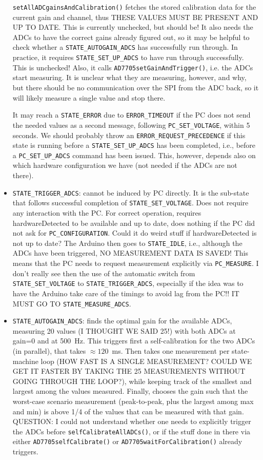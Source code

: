 \documentclass[11pt,a4paper,english]{article}
\begin{document}
\begin{itemize}
	\texttt{setAllADCgainsAndCalibration()} fetches the stored calibration data for the current gain and channel, thus THESE VALUES MUST BE PRESENT AND UP TO DATE. This is currently unchecked, but should be! It also needs the ADCs to have the correct gains already figured out, so it may be helpful to check whether a \texttt{STATE\_AUTOGAIN\_ADCS} has successfully run through. In practice, it requires \texttt{STATE\_SET\_UP\_ADCS} to have run through successfully. This is unchecked! Also, it calls \texttt{AD7705setGainAndTrigger()}, i.e. the ADCs start measuring. It is unclear what they are measuring, however, and why, but there should be no communication over the SPI from the ADC back, so it will likely measure a single value and stop there.

	It may reach a \texttt{STATE\_ERROR} due to \texttt{ERROR\_TIMEOUT} if the PC does not send the needed values as a second message, following \texttt{PC\_SET\_VOLTAGE}, within 5 seconds. We should probably throw an \texttt{ERROR\_REQUEST\_PRECEDENCE} if this state is running before a \texttt{STATE\_SET\_UP\_ADCS} has been completed, i.e., before a \texttt{PC\_SET\_UP\_ADCS} command has been issued. This, however, depends also on which hardware configuration we have (not needed if the ADCs are not there).

\item \texttt{STATE\_TRIGGER\_ADCS}: cannot be induced by PC directly. It is the sub-state that follows successful completion of \texttt{STATE\_SET\_VOLTAGE}. Does not require any interaction with the PC. For correct operation, requires hardwareDetected to be available and up to date, does nothing if the PC did not ask for \texttt{PC\_CONFIGURATION}. Could it do weird stuff if hardwareDetected is not up to date? The Arduino then goes to \texttt{STATE\_IDLE}, i.e., although the ADCs have been triggered, NO MEASUREMENT DATA IS SAVED! This means that the PC needs to request measurement explicitly via \texttt{PC\_MEASURE}. I don't really see then the use of the automatic switch from \texttt{STATE\_SET\_VOLTAGE} to \texttt{STATE\_TRIGGER\_ADCS}, especially if the idea was to have the Arduino take care of the timings to avoid lag from the PC!! IT MUST GO TO \texttt{STATE\_MEASURE\_ADCS}.

\item \texttt{STATE\_AUTOGAIN\_ADCS}: finds the optimal gain for the available ADCs, measuring 20 values (I THOUGHT WE SAID 25!) with both ADCs at gain=0 and at 500~Hz. This triggers first a self-calibration for the two ADCs (in parallel), that takes $\approx120$~ms. Then takes one measurement per state-machine loop (HOW FAST IS A SINGLE MEASUREMENT? COULD WE GET IT FASTER BY TAKING THE 25 MEASUREMENTS WITHOUT GOING THROUGH THE LOOP?), while keeping track of the smallest and largest among the values measured. Finally, chooses the gain such that the worst-case scenario measurement (peak-to-peak, plus the largest among max and min) is above 1/4 of the values that can be measured with that gain. QUESTION: I could not understand whether one needs to explicitly trigger the ADCs before \texttt{selfCalibrateAllADCs()}, or if the stuff done in there via either \texttt{AD7705selfCalibrate()} or \texttt{AD7705waitForCalibration()} already triggers.


\end{itemize}
\end{document}
